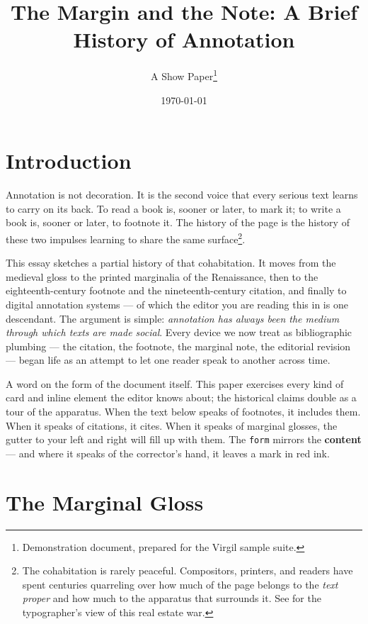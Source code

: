 \documentclass{article}
\title{The Margin and the Note: A Brief History of Annotation} %
\author{A Show Paper\vfid{f0ac}\thanks{Demonstration document, prepared for the Virgil sample suite.}} %
\date{\today} %
\providecommand{\vfid}[1]{}
\providecommand{\vcid}[1]{}
\begin{document}
\maketitle

\section{Introduction}
\label{sec:intro} %

Annotation is not decoration. It is the second voice that every serious text learns to carry on its back. To read a book is, sooner or later, to mark it; to write a book is, sooner or later, to footnote it. The history of the page is the history of these two impulses learning to share the same surface\vfid{f001}\footnote{The cohabitation is rarely peaceful. Compositors, printers, and readers have spent centuries quarreling over how much of the page belongs to the \emph{text proper} and how much to the apparatus that surrounds it. See \vcid{cc01}\citet{bringhurst2004} for the typographer's view of this real estate war.}. %

This essay sketches a partial history of that cohabitation. It moves from the medieval gloss to the printed marginalia of the Renaissance, then to the eighteenth-century footnote and the nineteenth-century citation, and finally to digital annotation systems --- of which the editor you are reading this in is one descendant. The argument is simple: \emph{annotation has always been the medium through which texts are made social}. Every device we now treat as bibliographic plumbing --- the citation, the footnote, the marginal note, the editorial revision --- began life as an attempt to let one reader speak to another across time. %

A word on the form of the document itself. This paper exercises every kind of card and inline element the editor knows about; the historical claims double as a tour of the apparatus. When the text below speaks of footnotes, it includes them. When it speaks of citations, it cites. When it speaks of marginal glosses, the gutter to your left and right will fill up with them. The \texttt{form} mirrors the \textbf{content} --- and where it speaks of the corrector's hand, it leaves a mark \textcolor[HTML]{C0392B}{in red ink}. %

\section{The Marginal Gloss}
\label{sec:gloss} %
\end{document}
